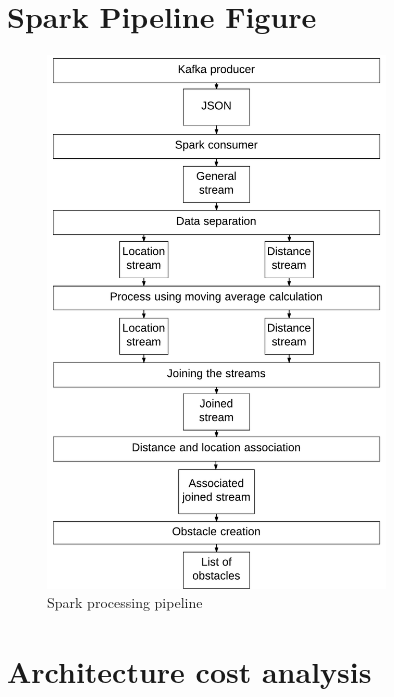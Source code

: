 \documentclass[prodmode,acmtosem]{acmsmall} %
\begin{document}
\section{Spark Pipeline Figure}
\label{app:SparkPipeline}
\begin{figure}[!ht]
\label{fig:SparkPipeline}
\centering
\includegraphics[width=0.8\textwidth]{SparkPipeline.pdf}
\caption{Spark processing pipeline}
\end{figure}
\clearpage
\pagebreak
\section{Architecture cost analysis}
\label{ArchitectureCost}
\end{document}
